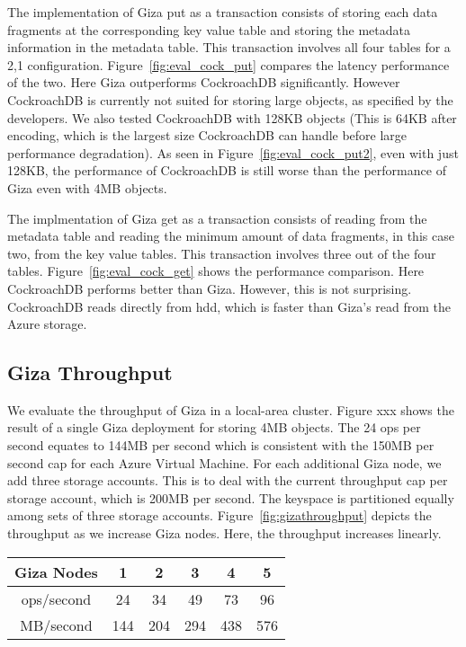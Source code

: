 The implementation of Giza put as a transaction consists of storing each data fragments at the corresponding key value table and storing the metadata information in the metadata table. This transaction involves all four tables for a 2,1 configuration. Figure~\ref{fig:eval_cock_put} compares the latency performance of the two. Here Giza outperforms CockroachDB significantly.
However CockroachDB is currently not suited for storing large objects, as specified by the developers. We also tested CockroachDB with 128KB objects (This is 64KB after encoding, which is the largest size CockroachDB can handle before large performance degradation). As seen in Figure~\ref{fig:eval_cock_put2}, even with just 128KB, the performance of CockroachDB is still worse than the performance of Giza even with 4MB objects.

The implmentation of Giza get as a transaction consists of reading from the metadata table and reading the minimum amount of data fragments, in this case two, from the key value tables. This transaction involves three out of the four tables. Figure~\ref{fig:eval_cock_get} shows the performance comparison. Here CockroachDB performs better than Giza. However, this is not surprising. CockroachDB reads directly from hdd, which is faster than Giza's read from the Azure storage.

\subsection{Giza Throughput}
We evaluate the throughput of Giza in a local-area cluster. Figure xxx shows the result of a single Giza deployment for storing 4MB objects. The 24 ops per second equates to 144MB per second which is consistent with the 150MB per second cap for each Azure Virtual Machine. For each additional Giza node, we add three storage accounts. This is to deal with the current throughput cap per storage account, which is 200MB per second.  The keyspace is partitioned equally among sets of three storage accounts. Figure~\ref{fig:gizathroughput} depicts the throughput as we increase Giza nodes. Here, the throughput increases linearly. 

\begin{figure*}
\begin{tabular}{c|c|c|c|c|c}
Giza Nodes & 1 & 2 & 3 & 4 & 5\\
\hline
ops/second & 24 & 34 & 49 & 73 & 96 \\
MB/second & 144 & 204 & 294 & 438 & 576\\ 
\end{tabular}
\caption{Throughput result of local Giza cluster\label{fig:gizathroughput}} 
\end{figure*}

